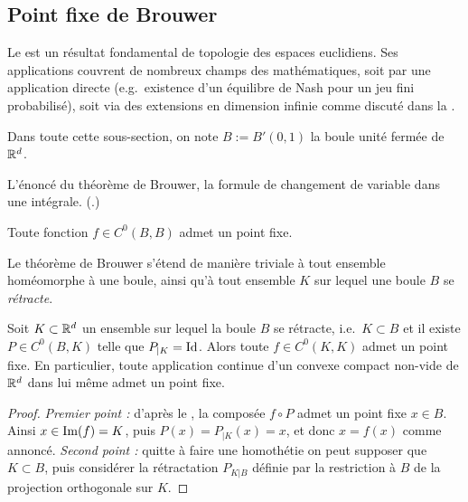 
\subsection{Point fixe de Brouwer}
\label{subsec:Brouwer}

Le  est un résultat fondamental de topologie des espaces euclidiens. Ses applications couvrent de nombreux champs des mathématiques, soit par une application directe (e.g.\ existence d'un équilibre de Nash pour un jeu fini probabilisé), soit via des extensions en dimension infinie comme discuté dans la .

Dans toute cette sous-section, on note $B := B'(0,1)$ la boule unité fermée de $\mathbb{R}^d$.

\begin{retenir}
L'énoncé du théorème de Brouwer, la formule de changement de variable dans une intégrale.
(.) 
\end{retenir}



\begin{theorem}
\label{th:Brouwer}
%
	Toute fonction $f \in C^0(B, B)$ admet un point fixe. 
\end{theorem}

Le théorème de Brouwer s'étend de manière triviale à tout ensemble homéomorphe à une boule, ainsi qu'à tout ensemble $K$ sur lequel une boule $B$ se \emph{rétracte}.

\begin{corollary}	
	Soit $K \subset \mathbb{R}^d$ un ensemble sur lequel la boule $B$ se rétracte, i.e.\ $K \subset B$ et il existe $P \in C^0(B,K)$ telle que $P_{|K}=\operatorname{Id}$. Alors toute  $f\in C^0(K,K)$ admet un point fixe. 
	En particulier, toute application continue d'un convexe compact non-vide de $\mathbb{R}^d$ dans lui même admet un point fixe.
\end{corollary}

\begin{proof}
	\emph{Premier point : }d'après le , la composée $f\circ P$ admet un point fixe $x \in B$. Ainsi $x \in \operatorname{Im}(f) = K$, puis $P(x) = P_{|K}(x) = x$, et donc $x=f(x)$ comme annoncé.
	\emph{Second point : }quitte à faire une homothétie on peut supposer que $K \subset B$, puis considérer la rétractation $P_{K|B}$ définie par la restriction à $B$ de la projection orthogonale sur $K$.
\end{proof}

